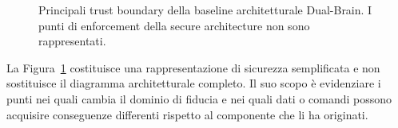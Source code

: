 \documentclass[11pt,a4paper]{article}
\begin{document}
\begin{figure}[H]
{%
}

\caption{Principali trust boundary della baseline architetturale
Dual-Brain. I punti di enforcement della secure architecture non sono
rappresentati.}
\label{fig:trust-boundaries}
\end{figure}

La Figura~\ref{fig:trust-boundaries} costituisce una rappresentazione di
sicurezza semplificata e non sostituisce il diagramma architetturale
completo. Il suo scopo è evidenziare i punti nei quali cambia il dominio
di fiducia e nei quali dati o comandi possono acquisire conseguenze
differenti rispetto al componente che li ha originati.


\begingroup

\setlength{\tabcolsep}{5pt}
\small
\end{document}
